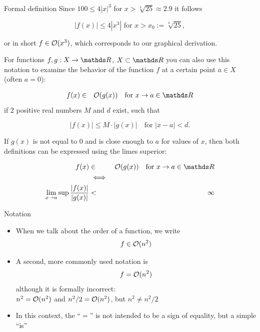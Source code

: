 \begin{vbframe}{Formal definition}
Since $100 \le 4 |x|^3$ for $x > \sqrt[3]{25} \approx 2.9$ it follows

$$
|f(x)| \le 4 |x^3| \text{  for  } x > x_0 := \sqrt[3]{25},
$$

or in short $f \in \mathcal{O}(x^3)$, which corresponds to our graphical derivation.


\framebreak

For functions $f, g: X \to \R$, $X\subset \R$ you can also use this notation to examine the behavior of the function $f$ at a certain point $a \in X$ (often $a=0$):

\begin{eqnarray*}
  f(x) &\in& \order(g(x)) \quad \text{for } x \to a \in \R \\
\end{eqnarray*}
if 2 positive real numbers $M$ and $d$ exist, such that

$$
|f(x)| \leq M \cdot |g(x)| \quad \text{for } |x-a| < d.
$$

\framebreak

  If $g(x)$ is not equal to 0 and is close enough to $a$ for values of $x$, then both definitions can be expressed using the limes superior:

\begin{eqnarray*}
  f(x) &\in& \order(g(x)) \quad \text{for } x \to a \in \R \\
  &\iff& \\
  \lim_{x \rightarrow a} \sup \frac{|f(x)|}{|g(x)|} &<& \infty\\
\end{eqnarray*}

\end{vbframe}

\begin{vbframe}{Notation}

  \begin{itemize}
    \item When we talk about the order of a function, we write
    $$f \in \mathcal{O}(n^2)$$
    \item A second, more commonly used notation is
        $$f = \mathcal{O}(n^2)$$
        although it is formally incorrect:\\
    $n^2 = \mathcal{O}(n^2)$ and $n^2/2 = \mathcal{O}(n^2)$, but $n^2 \neq n^2/2$
    \item In this context, the \enquote{$=$} is not intended to be a sign of equality, but a simple \enquote{is}
  \end{itemize}
\end{vbframe}

